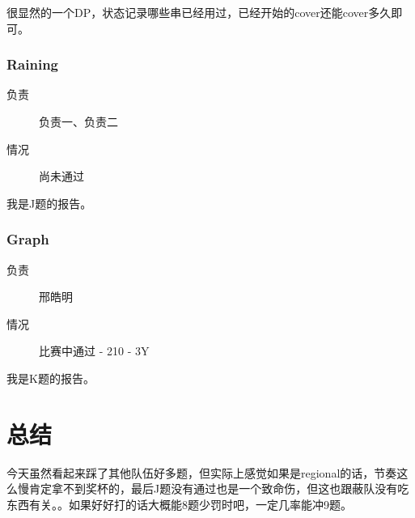 \documentclass[a4paper, 11pt, nofonts, nocap, fancyhdr]{ctexart}
\newcommand{\problem}[1]{\subsubsection{#1}}
\begin{document}
很显然的一个DP，状态记录哪些串已经用过，已经开始的cover还能cover多久即可。

\problem{Raining}

\begin{description}
\item[负责] 负责一、负责二
\item[情况] 尚未通过
\end{description}

我是J题的报告。

\problem{Graph}

\begin{description}
\item[负责] 邢皓明
\item[情况] 比赛中通过 - 210 - 3Y
\end{description}

我是K题的报告。

\section{总结}

今天虽然看起来踩了其他队伍好多题，但实际上感觉如果是regional的话，节奏这么慢肯定拿不到奖杯的，最后J题没有通过也是一个致命伤，但这也跟蔽队没有吃东西有关。。如果好好打的话大概能8题少罚时吧，一定几率能冲9题。
\end{document}
